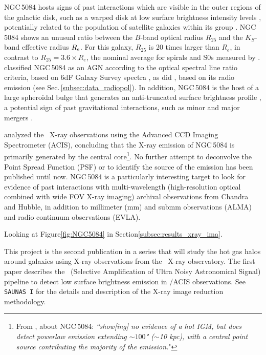 \documentclass[modern]{CORE-AAS/aastex631}
\begin{document}
NGC\,5084 hosts signs of past interactions which are visible in the outer regions of the galactic disk, such as a warped disk at low surface brightness intensity levels \citep{zeilinger+1990mnras246_324}, potentially related to the population of satellite galaxies within its group \citep{carignan+1997aj113_1585}. NGC\,5084 shows an unusual ratio between the $B$-band optical radius $R_{25}$ and the $K_S$-band
effective radius $R_{\rm e}$. For this galaxy, $R_{25}$ is 20 times larger than $R_e$, in contrast to $R_{25}=3.6 \times R_e$, the nominal average for spirals and S0s measured by  \citet[][]{williams+2009mnras400_1665}.  \citet{zaw+2019apj872_134} classified NGC\,5084 as an AGN according to the \citet{kewley+2001apj556_121} optical spectral line ratio criteria, based on 6dF Galaxy Survey spectra \citep{jones+2004mnras355_747,jones+2009mnras399_683}, as did \citet{irwin+2019aj158_21}, based on its radio emission (see Sec.\,\ref{subsec:data_radiopol}). In addition, NGC\,5084 is the host of a large spheroidal bulge that generates an anti-truncated surface brightness profile \citep{comeron+2012apj759_98}, a potential sign of past gravitational interactions, such as minor and major mergers \citep{younger+2007apj670_269, borlaff+2014aap570_103}.

\citet{osullivan+2017mnras472_1482} analyzed the \Chandra\ X-ray observations using the Advanced CCD Imaging Spectrometer (ACIS), concluding that the X-ray emission of NGC\,5084 is primarily generated by the central core\footnote{From \citet{osullivan+2017mnras472_1482}, about NGC\,5084: \emph{``show[ing] no evidence of a hot IGM, but does detect powerlaw emission extending $\sim100$" ($\sim$10 kpc), with a central point
source contributing the majority of the emission.}"}. No further attempt to deconvolve the Point Spread Function (PSF) or to identify the source of the emission has been published until now.  NGC\,5084 is a particularly interesting target to look for evidence of past interactions with multi-wavelength (high-resolution optical combined with wide FOV X-ray imaging) archival observations from Chandra and Hubble, in addition to millimeter (mm) and submm observations (ALMA) and radio continuum observations (EVLA). 

Looking at Figure\ref{fig:NGC5084} in Section\ref{subsec:results_xray_ima}.

This project is the second publication in a series that will study the hot gas halos around galaxies using X-ray observations from the \Chandra\ X-ray observatory. The first paper \citep[first thing][\texttt{SAUNAS I}, hereafter]{borlaff+2024apj967_169} describes the \SAUNAS\ (Selective Amplification of Ultra Noisy Astronomical Signal) pipeline to detect low surface brightness emission in \Chandra/ACIS observations. See \texttt{SAUNAS I} for the details and description of the X-ray image reduction methodology.
\end{document}
